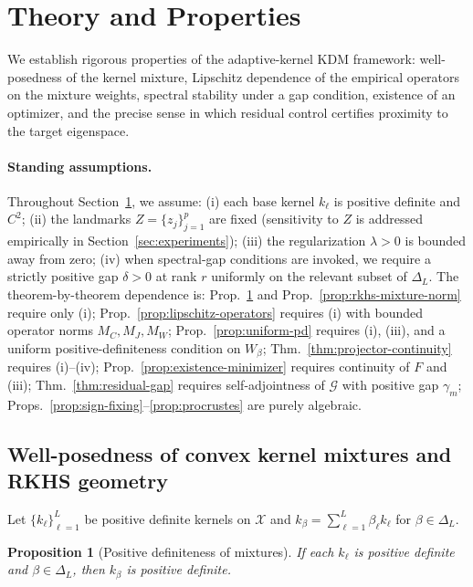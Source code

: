 \documentclass[11pt]{article}
\newtheorem{proposition}{Proposition}[section]
\theoremstyle{remark}
\begin{document}
\section{Theory and Properties}
\label{sec:theory}

We establish rigorous properties of the adaptive-kernel KDM framework: well-posedness of the kernel mixture, Lipschitz dependence of the empirical operators on the mixture weights, spectral stability under a gap condition, existence of an optimizer, and the precise sense in which residual control certifies proximity to the target eigenspace.

\paragraph{Standing assumptions.}
Throughout Section~\ref{sec:theory}, we assume: (i) each base kernel $k_\ell$ is positive definite and $C^2$; (ii) the landmarks $Z=\{z_j\}_{j=1}^p$ are fixed (sensitivity to $Z$ is addressed empirically in Section~\ref{sec:experiments}); (iii) the regularization $\lambda>0$ is bounded away from zero; (iv) when spectral-gap conditions are invoked, we require a strictly positive gap $\delta>0$ at rank $r$ uniformly on the relevant subset of $\Delta_L$.
The theorem-by-theorem dependence is:
Prop.~\ref{prop:pd-mixture} and Prop.~\ref{prop:rkhs-mixture-norm} require only (i);
Prop.~\ref{prop:lipschitz-operators} requires (i) with bounded operator norms $M_C, M_J, M_W$;
Prop.~\ref{prop:uniform-pd} requires (i), (iii), and a uniform positive-definiteness condition on $W_\beta$;
Thm.~\ref{thm:projector-continuity} requires (i)--(iv);
Prop.~\ref{prop:existence-minimizer} requires continuity of $F$ and (iii);
Thm.~\ref{thm:residual-gap} requires self-adjointness of $\mathcal{G}$ with positive gap $\gamma_m$;
Props.~\ref{prop:sign-fixing}--\ref{prop:procrustes} are purely algebraic.

\subsection{Well-posedness of convex kernel mixtures and RKHS geometry}
\label{subsec:theory-mixture}

Let $\{k_\ell\}_{\ell=1}^L$ be positive definite kernels on $\mathcal{X}$ and $k_\beta=\sum_{\ell=1}^L \beta_\ell k_\ell$ for $\beta\in\Delta_L$.

\begin{proposition}[Positive definiteness of mixtures]
\label{prop:pd-mixture}
If each $k_\ell$ is positive definite and $\beta\in\Delta_L$, then $k_\beta$ is positive definite.
\end{proposition}
\end{document}
